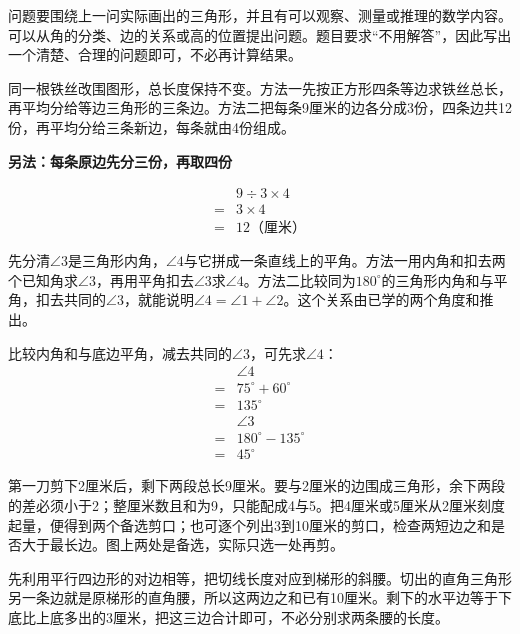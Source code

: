 \documentclass[multi=snippet,border=0pt]{standalone}
\newenvironment{snippet}[3]{\begin{minipage}{#1bp}\color{answerred}\fontsize{#2}{#3}\selectfont\raggedright}{\end{minipage}}
\begin{document}
\begin{snippet}{505}{11.5}{14}问题要围绕上一问实际画出的三角形，并且有可以观察、测量或推理的数学内容。可以从角的分类、边的关系或高的位置提出问题。题目要求“不用解答”，因此写出一个清楚、合理的问题即可，不必再计算结果。\end{snippet}
\begin{snippet}{505}{11.5}{14}同一根铁丝改围图形，总长度保持不变。方法一先按正方形四条等边求铁丝总长，再平均分给等边三角形的三条边。方法二把每条9厘米的边各分成3份，四条边共12份，再平均分给三条新边，每条就由4份组成。\par \textbf{另法：每条原边先分三份，再取四份}\par \[\begin{aligned}&9\div3\times4\\={}&3\times4\\={}&12\text{（厘米）}\end{aligned}\]\end{snippet}
\begin{snippet}{505}{11.5}{14}先分清\(\angle3\)是三角形内角，\(\angle4\)与它拼成一条直线上的平角。方法一用内角和扣去两个已知角求\(\angle3\)，再用平角扣去\(\angle3\)求\(\angle4\)。方法二比较同为\(180^\circ\)的三角形内角和与平角，扣去共同的\(\angle3\)，就能说明\(\angle4=\angle1+\angle2\)。这个关系由已学的两个角度和推出。\par 比较内角和与底边平角，减去共同的\(\angle3\)，可先求\(\angle4\)：\[\begin{aligned}&\angle4\\={}&75^\circ+60^\circ\\={}&135^\circ\\&\angle3\\={}&180^\circ-135^\circ\\={}&45^\circ\end{aligned}\]\end{snippet}
\begin{snippet}{505}{11.5}{14}第一刀剪下2厘米后，剩下两段总长9厘米。要与2厘米的边围成三角形，余下两段的差必须小于2；整厘米数且和为9，只能配成4与5。把4厘米或5厘米从2厘米刻度起量，便得到两个备选剪口；也可逐个列出3到10厘米的剪口，检查两短边之和是否大于最长边。图上两处是备选，实际只选一处再剪。\end{snippet}
\begin{snippet}{505}{11.5}{14}先利用平行四边形的对边相等，把切线长度对应到梯形的斜腰。切出的直角三角形另一条边就是原梯形的直角腰，所以这两边之和已有10厘米。剩下的水平边等于下底比上底多出的3厘米，把这三边合计即可，不必分别求两条腰的长度。\end{snippet}
\end{document}
